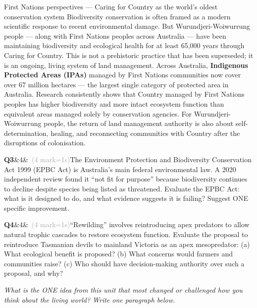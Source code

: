\documentclass[11pt,a4paper]{article}
\newcommand{\answerbox}[1]{%
  \begin{tcolorbox}[
    enhanced, breakable, arc=2mm,
    colback=Paper, colframe=Line,
    left=2mm, right=2mm, top=1mm, bottom=1mm,
    boxrule=1pt,
    height=#1
  ]
  \end{tcolorbox}%
}
\newcommand{\question}[3]{%
  \needspace{3\baselineskip}%
  \medskip
  \noindent\textbf{Q#1}\ifx&#2&\else\ \textcolor{DarkGrey}{(#2 mark\ifnum#2=1\else s\fi)}\fi\quad #3%
  \medskip
}
\begin{document}
\begin{fnbox}{First Nations perspectives --- Caring for Country as the world's oldest conservation system}
Biodiversity conservation is often framed as a modern scientific response to recent environmental damage. But Wurundjeri-Woiwurrung people --- along with First Nations peoples across Australia --- have been maintaining biodiversity and ecological health for at least 65,000 years through Caring for Country. This is not a prehistoric practice that has been superseded; it is an ongoing, living system of land management. Across Australia, \textbf{Indigenous Protected Areas (IPAs)} managed by First Nations communities now cover over 67 million hectares --- the largest single category of protected area in Australia. Research consistently shows that Country managed by First Nations peoples has higher biodiversity and more intact ecosystem function than equivalent areas managed solely by conservation agencies. For Wurundjeri-Woiwurrung people, the return of land management authority is also about self-determination, healing, and reconnecting communities with Country after the disruptions of colonisation.
\end{fnbox}

\begin{yr8box}
\question{3}{4}{The Environment Protection and Biodiversity Conservation Act 1999 (EPBC Act) is Australia's main federal environmental law. A 2020 independent review found it ``not fit for purpose'' because biodiversity continues to decline despite species being listed as threatened. Evaluate the EPBC Act: what is it designed to do, and what evidence suggests it is failing? Suggest ONE specific improvement.}
\answerbox{5cm}

\question{4}{4}{``Rewilding'' involves reintroducing apex predators to allow natural trophic cascades to restore ecosystem function. Evaluate the proposal to reintroduce Tasmanian devils to mainland Victoria as an apex mesopredator: (a) What ecological benefit is proposed? (b) What concerns would farmers and communities raise? (c) Who should have decision-making authority over such a proposal, and why?}
\answerbox{6cm}
\end{yr8box}

\bigskip
\begin{tcolorbox}[colback=white, colframe=MidGrey, title={\textbf{Final reflection}}, fonttitle=\small\bfseries, boxrule=0.5pt, top=4pt, bottom=4pt]
\small\textit{What is the ONE idea from this unit that most changed or challenged how you think about the living world? Write one paragraph below.}

\vspace{13.5cm}
\end{tcolorbox}
\end{document}
